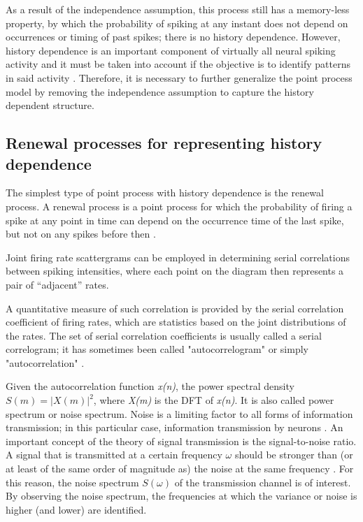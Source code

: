 \documentclass{article}
\begin{document}
As a result of the independence assumption, this process still has a memory-less property, by which the probability of spiking at any instant does not depend on occurrences or timing of past spikes; there is no history dependence. 
However, history dependence is an important component of virtually all neural spiking activity and it must be taken into account if the objective is to identify patterns in said activity \citep{Perkel}. 
Therefore, it is necessary to further generalize the point process model by removing the independence assumption to capture the history dependent structure.

\subsection{Renewal processes for representing history dependence}

The simplest type of point process with history dependence is the renewal process. 
A renewal process is a point process for which the probability of firing a spike at any point in time can depend on the occurrence time of the last spike, but not on any spikes before then  \citep{Perkel}. 

Joint firing rate scattergrams can be employed in determining serial correlations between spiking intensities, where each point on the diagram then represents a pair of “adjacent” rates. 

A quantitative measure of such correlation is provided by the serial correlation coefficient of firing rates, which are statistics based on the joint distributions of the rates. 
The set of serial correlation coefficients is usually called a serial correlogram; it has sometimes been called "autocorrelogram" or simply "autocorrelation"  \citep{Perkel}. 

Given the autocorrelation function \textit{x(n)}, the power spectral density \begin{math}S(m) = |X(m)|^2\end{math}, where \textit{X(m)} is the DFT of \textit{x(n)}. 
It is also called power spectrum or noise spectrum. 
Noise is a limiting factor to all forms of information transmission; in this particular case, information transmission by neurons \citep{Gerstner}. 
An important concept of the theory of signal transmission is the signal-to-noise ratio. 
A signal that is transmitted at a certain frequency \begin{math}\omega\end{math} should be stronger than (or at least of the same order of magnitude as) the noise at the same frequency \citep{Gerstner}. 
For this reason, the noise spectrum \begin{math}S(\omega)\end{math} of the transmission channel is of interest. 
By observing the noise spectrum, the frequencies at which the variance or noise is higher (and lower) are identified.
\end{document}
